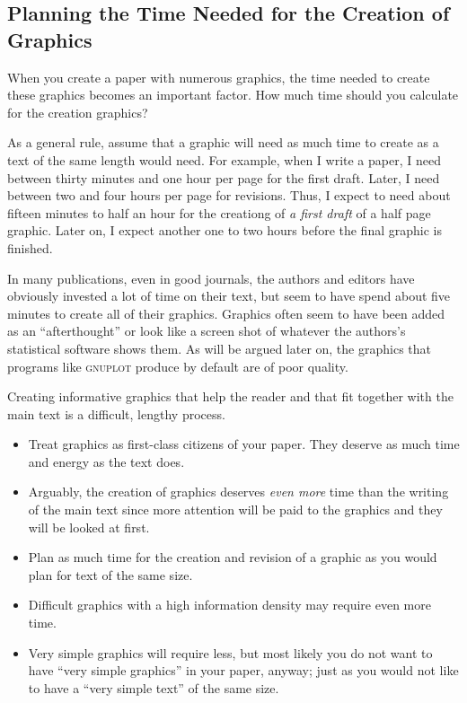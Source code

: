 \subsection{Planning the Time Needed for the Creation of Graphics}

When you create a paper with numerous graphics, the time needed to
create these graphics becomes an important factor. How much time
should you calculate for the creation graphics?

As a general rule, assume that a graphic will need as much time to
create as a text of the same length would need. For example, when I
write a paper, I need between thirty minutes and one hour per page for
the first draft. Later, I need between two and four hours per page
for revisions. Thus, I expect to need about fifteen minutes to half an
hour for the creationg of \emph{a first draft} of a half page
graphic. Later on, I expect another one to two hours before the final
graphic is finished.

In many publications, even in good journals, the authors and editors
have obviously  invested a lot of time on their text, but seem to 
have spend about five minutes to create all of their
graphics. Graphics often seem to have been added as an
``afterthought'' or look like a screen shot of whatever the authors's
statistical software shows them. As will be argued later on, the
graphics that programs like \textsc{gnuplot} produce by default are of
poor quality.

Creating informative graphics that help the reader and that fit
together with the main text is a difficult, lengthy process. 
\begin{itemize}
\item
  Treat graphics as first-class citizens of your paper. They deserve
  as much time and energy as the text does.
\item
  Arguably, the creation of graphics deserves \emph{even more} time
  than the writing of the main text since more attention will  be paid
  to the graphics and they will be looked at first. 
\item
  Plan as much time for the creation and revision of a graphic as you
  would plan for text of the same size.
\item
  Difficult graphics with a high information density may require even
  more time.
\item
  Very simple graphics will require less, but most likely you do not
  want to have ``very simple graphics'' in your paper, anyway; just
  as you would not like to have a ``very simple text'' of the same
  size.  
\end{itemize}



